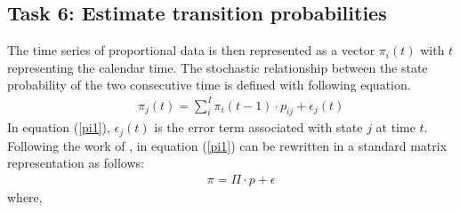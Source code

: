 \documentclass[Journal]{ascelike}
\begin{document}
\subsection{Task 6: Estimate transition probabilities}

\label{optimizationmodel} %


The time series of proportional data is then represented as a vector
$\pi_{i}(t)$ with $t$ representing the calendar time. The stochastic
relationship between the state probability of the two consecutive
time is defined with following equation. 
\begin{eqnarray}
 &  & \pi_{j}(t)=\sum_{i}^{I}\pi_{i}(t-1)\cdot p_{ij}+\epsilon_{j}(t)\label{pi1}
\end{eqnarray}
In equation (\ref{pi1}), $\epsilon_{j}(t)$ is the error term associated
with state $j$ at time $t$. Following the work of ,
in equation (\ref{pi1}) can be rewritten in a standard matrix representation
as follows: 
\begin{eqnarray}
 &  & \pi=\Pi\cdot p+\epsilon\label{pi2}
\end{eqnarray}
where,
\end{document}
